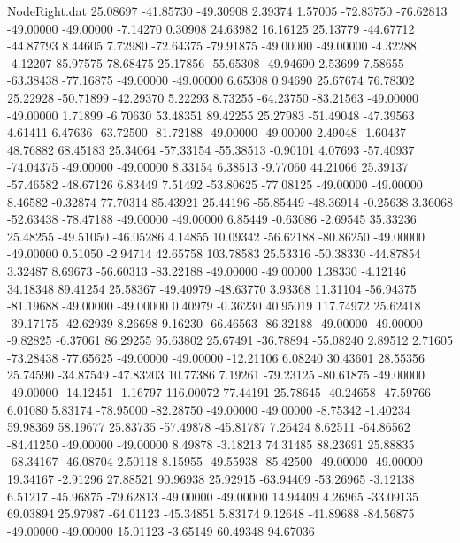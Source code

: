 \begin{filecontents}{NodeRight.dat}
  25.08697  -41.85730  -49.30908     2.39374    1.57005  -72.83750  -76.62813  -49.00000  -49.00000   -7.14270    0.30908   24.63982   16.16125
  25.13779  -44.67712  -44.87793     8.44605    7.72980  -72.64375  -79.91875  -49.00000  -49.00000   -4.32288   -4.12207   85.97575   78.68475
  25.17856  -55.65308  -49.94690     2.53699    7.58655  -63.38438  -77.16875  -49.00000  -49.00000    6.65308    0.94690   25.67674   76.78302
  25.22928  -50.71899  -42.29370     5.22293    8.73255  -64.23750  -83.21563  -49.00000  -49.00000    1.71899   -6.70630   53.48351   89.42255
  25.27983  -51.49048  -47.39563     4.61411    6.47636  -63.72500  -81.72188  -49.00000  -49.00000    2.49048   -1.60437   48.76882   68.45183
  25.34064  -57.33154  -55.38513    -0.90101    4.07693  -57.40937  -74.04375  -49.00000  -49.00000    8.33154    6.38513   -9.77060   44.21066
  25.39137  -57.46582  -48.67126     6.83449    7.51492  -53.80625  -77.08125  -49.00000  -49.00000    8.46582   -0.32874   77.70314   85.43921
  25.44196  -55.85449  -48.36914    -0.25638    3.36068  -52.63438  -78.47188  -49.00000  -49.00000    6.85449   -0.63086   -2.69545   35.33236
  25.48255  -49.51050  -46.05286     4.14855   10.09342  -56.62188  -80.86250  -49.00000  -49.00000    0.51050   -2.94714   42.65758  103.78583
  25.53316  -50.38330  -44.87854     3.32487    8.69673  -56.60313  -83.22188  -49.00000  -49.00000    1.38330   -4.12146   34.18348   89.41254
  25.58367  -49.40979  -48.63770     3.93368   11.31104  -56.94375  -81.19688  -49.00000  -49.00000    0.40979   -0.36230   40.95019  117.74972
  25.62418  -39.17175  -42.62939     8.26698    9.16230  -66.46563  -86.32188  -49.00000  -49.00000   -9.82825   -6.37061   86.29255   95.63802
  25.67491  -36.78894  -55.08240     2.89512    2.71605  -73.28438  -77.65625  -49.00000  -49.00000  -12.21106    6.08240   30.43601   28.55356
  25.74590  -34.87549  -47.83203    10.77386    7.19261  -79.23125  -80.61875  -49.00000  -49.00000  -14.12451   -1.16797  116.00072   77.44191
  25.78645  -40.24658  -47.59766     6.01080    5.83174  -78.95000  -82.28750  -49.00000  -49.00000   -8.75342   -1.40234   59.98369   58.19677
  25.83735  -57.49878  -45.81787     7.26424    8.62511  -64.86562  -84.41250  -49.00000  -49.00000    8.49878   -3.18213   74.31485   88.23691
  25.88835  -68.34167  -46.08704     2.50118    8.15955  -49.55938  -85.42500  -49.00000  -49.00000   19.34167   -2.91296   27.88521   90.96938
  25.92915  -63.94409  -53.26965    -3.12138    6.51217  -45.96875  -79.62813  -49.00000  -49.00000   14.94409    4.26965  -33.09135   69.03894
  25.97987  -64.01123  -45.34851     5.83174    9.12648  -41.89688  -84.56875  -49.00000  -49.00000   15.01123   -3.65149   60.49348   94.67036

\end{filecontents}
